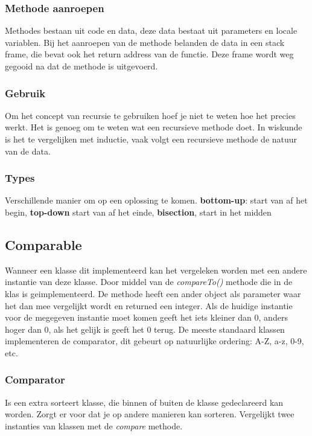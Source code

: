 \subsubsection{Methode aanroepen}
Methodes bestaan uit code en data, deze data bestaat uit parameters en locale variablen.
Bij het aanroepen van de methode belanden de data in een stack frame, die bevat ook het return address van de functie.
Deze frame wordt weg gegooid na dat de methode is uitgevoerd.

\subsubsection{Gebruik}
Om het concept van recursie te gebruiken hoef je niet te weten hoe het precies werkt.
Het is genoeg om te weten wat een recursieve methode doet.
In wiskunde is het te vergelijken met inductie, vaak volgt een recursieve methode de natuur van de data.

\subsubsection{Types}
Verschillende manier om op een oplossing te komen.
\textbf{bottom-up}: start van af het begin, \textbf{top-down} start van af het einde, \textbf{bisection}, start in het midden

\subsection{Comparable}
Wanneer een klasse dit implementeerd kan het vergeleken worden met een andere instantie van deze klasse.
Door middel van de \textit{compareTo()} methode die in de klas is geimplementeerd.
De methode heeft een ander object als parameter waar het dan mee vergelijkt wordt en returned een integer.
Als de huidige instantie voor de megegeven instantie moet komen geeft het iets kleiner dan 0, anders hoger dan 0, als het gelijk is geeft het 0 terug.
De meeste standaard klassen implementeren de comparator, dit gebeurt op natuurlijke ordering: A-Z, a-z, 0-9, etc.

\subsubsection{Comparator}
Is een extra sorteert klasse, die binnen of buiten de klasse gedeclareerd kan worden.
Zorgt er voor dat je op andere manieren kan sorteren.
Vergelijkt twee instanties van klassen met de \textit{compare} methode.
